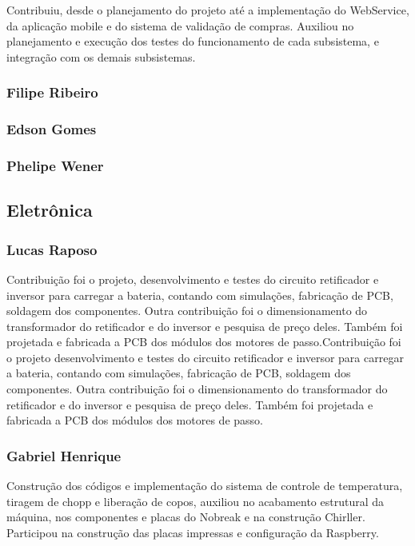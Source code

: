 \begin{apendicesenv}
Contribuiu, desde o planejamento do projeto até a implementação do WebService, da aplicação mobile
e do sistema de validação de compras. Auxiliou no planejamento e execução dos testes do funcionamento
de cada subsistema, e integração com os demais subsistemas.

\subsubsection{Filipe Ribeiro}

\subsubsection{Edson Gomes}

\subsubsection{Phelipe Wener}

\subsection{Eletrônica}

\subsubsection{Lucas Raposo}

Contribuição foi o projeto, desenvolvimento e testes do circuito retificador
e inversor para carregar a bateria, contando com simulações, fabricação de PCB,
soldagem dos componentes. Outra contribuição foi o dimensionamento do transformador 
do retificador e do inversor e pesquisa de preço deles. Também foi projetada e fabricada
a PCB dos módulos dos motores de passo.Contribuição foi o projeto desenvolvimento
e testes do circuito retificador e inversor para carregar a bateria, contando com simulações, 
fabricação de PCB, soldagem dos componentes. Outra contribuição foi o dimensionamento
do transformador do retificador e do inversor e pesquisa de preço deles. Também foi projetada
e fabricada a PCB dos módulos dos motores de passo.

\subsubsection{Gabriel Henrique}

Construção dos códigos e implementação do sistema de controle de temperatura,
tiragem de chopp e liberação de copos, auxiliou no acabamento estrutural da máquina,
nos componentes e placas do Nobreak e na construção Chirller. Participou na construção
das placas impressas e configuração da Raspberry.


\end{apendicesenv}
